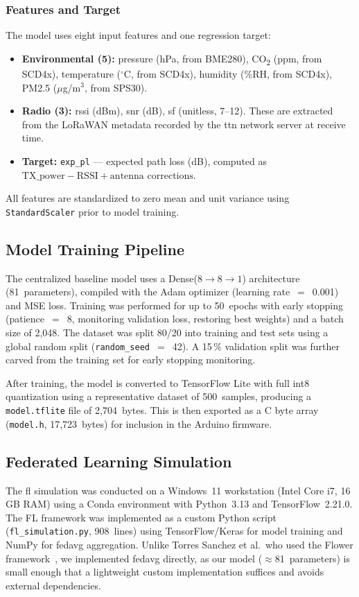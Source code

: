 \documentclass[12pt, a4paper, twoside, openright]{report}
\begin{document}
\subsubsection{Features and Target}
The model uses eight input features and one regression target:
\begin{itemize}
  \item \textbf{Environmental (5):} pressure (hPa, from BME280), CO\textsubscript{2} (ppm, from SCD4x), temperature ($^{\circ}$C, from SCD4x), humidity (\%RH, from SCD4x), PM2.5 ($\mu$g/m$^3$, from SPS30).
  \item \textbf{Radio (3):} \gls{rssi} (dBm), \gls{snr} (dB), \gls{sf} (unitless, 7--12). These are extracted from the LoRaWAN metadata recorded by the \gls{ttn} network server at receive time.
  \item \textbf{Target:} \texttt{exp\_pl} --- expected path loss (dB), computed as $\text{TX\_power} - \text{RSSI} + \text{antenna corrections}$.
\end{itemize}
All features are standardized to zero mean and unit variance using \texttt{StandardScaler} prior to model training.

\subsection{Model Training Pipeline}
The centralized baseline model uses a Dense($8{\to}8{\to}1$) architecture (81~parameters), compiled with the Adam optimizer (learning rate~$=$~0.001) and MSE loss. Training was performed for up to 50~epochs with early stopping (patience~$=$~8, monitoring validation loss, restoring best weights) and a batch size of 2{,}048. The dataset was split 80/20 into training and test sets using a global random split (\texttt{random\_seed}~$=$~42). A 15\,\% validation split was further carved from the training set for early stopping monitoring.

After training, the model is converted to TensorFlow Lite with full int8 quantization using a representative dataset of 500~samples, producing a \texttt{model.tflite} file of 2{,}704~bytes. This is then exported as a C byte array (\texttt{model.h}, 17{,}723~bytes) for inclusion in the Arduino firmware.

\subsection{Federated Learning Simulation}
\label{sec:fl-sim}

The \gls{fl} simulation was conducted on a Windows~11 workstation (Intel Core i7, 16\,GB RAM) using a Conda environment with Python~3.13 and TensorFlow~2.21.0. The FL framework was implemented as a custom Python script (\texttt{fl\_simulation.py}, 908~lines) using TensorFlow/Keras for model training and NumPy for \gls{fedavg} aggregation. Unlike Torres Sanchez et al.\ who used the Flower framework~\cite{beutel2020flower}, we implemented \gls{fedavg} directly, as our model ($\approx$81~parameters) is small enough that a lightweight custom implementation suffices and avoids external dependencies.
\end{document}
